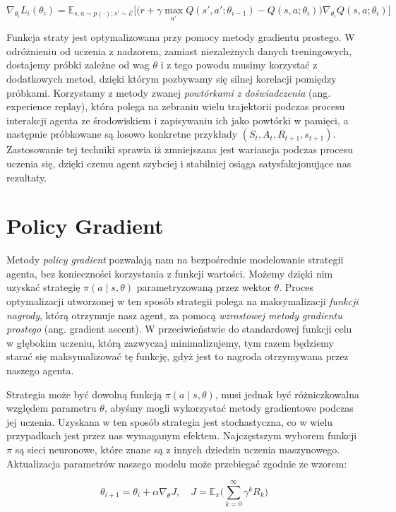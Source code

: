 \documentclass[licencjacka]{pracamgr}
\begin{document}
$$ \nabla_{\theta_i}L_i(\theta_i) = \mathbb{E}_{s, a \sim p(\cdot); s' \sim \mathcal{E}} 
\Big[ \Big( r + \gamma \max_{a'} Q(s', a'; \theta_{i - 1}) - Q(s, a; \theta_i) \Big) \nabla_{\theta_i} Q(s, a; \theta_i) \Big] $$

Funkcja straty jest optymalizowana przy pomocy metody gradientu prostego. W odróżnieniu od uczenia z nadzorem, zamiast niezależnych danych treningowych, dostajemy próbki zależne od wag $\theta$ i z tego powodu musimy korzystać z dodatkowych metod, dzięki którym pozbywamy się silnej korelacji pomiędzy próbkami. Korzystamy z metody zwanej \emph{powtórkami z doświadczenia} (ang. experience replay), która polega na zebraniu wielu trajektorii podczas procesu interakcji agenta ze środowiskiem i zapisywaniu ich jako powtórki w pamięci, a następnie próbkowane są losowo konkretne przykłady $(S_t, A_t, R_{t+1}, s_{t+1})$. Zastosowanie tej techniki sprawia iż zmniejszana jest wariancja podczas procesu uczenia się, dzięki czemu agent szybciej i stabilniej osiąga satysfakcjonujące nas rezultaty.


\section{Policy Gradient}

Metody \emph{policy gradient} \cite{policy-gradient-sutton} pozwalają nam na bezpośrednie modelowanie strategii agenta, bez konieczności korzystania z funkcji wartości. Możemy dzięki nim uzyskać strategię $\pi(a \mid s, \theta)$ parametryzowaną przez wektor $\theta$. Proces optymalizacji utworzonej w ten sposób strategii polega na maksymalizacji \emph{funkcji nagrody}, którą otrzymuje nasz agent, za pomocą \emph{wzrostowej metody gradientu prostego} (ang. gradient ascent). W przeciwieństwie do standardowej funkcji celu w głębokim uczeniu, którą zazwyczaj minimalizujemy, tym razem będziemy starać się maksymalizować tę funkcję, gdyż jest to nagroda otrzymywana przez naszego agenta.

Strategia może być dowolną funkcją $\pi(a \mid s, \theta)$, musi jednak być różniczkowalna względem parametru $\theta$, abyśmy mogli wykorzystać metody gradientowe podczas jej uczenia. Uzyskana w ten sposób strategia jest stochastyczna, co w wielu przypadkach jest przez nas wymaganym efektem. Najczęstszym wyborem funkcji $\pi$ są sieci neuronowe, które znane są z innych dziedzin uczenia maszynowego. Aktualizacja parametrów naszego modelu może przebiegać zgodnie ze wzorem:

$$ \theta_{i+1} = \theta_i + \alpha \nabla_{\theta}J , \quad
J = \mathbb{E}_{\pi} \Big( \sum_{k = 0}^{\infty} \gamma^k R_k \Big)
$$
\end{document}
